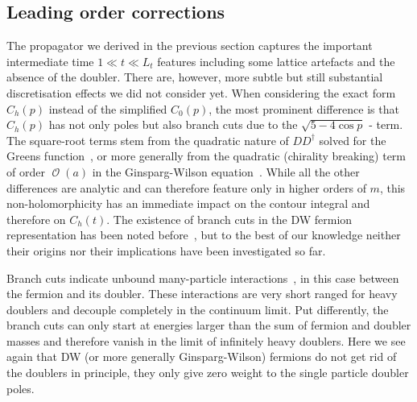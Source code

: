 \documentclass[a4paper]{article}
\DeclareMathOperator{\ord}{\mathcal{O}}
\newcommand{\ordnung}[1]{\ensuremath{\ord\left(#1\right)}}
\begin{document}
	\subsection{Leading order corrections}
	The propagator we derived in the previous section captures the important intermediate time $1\ll t \ll L_t$ features including some lattice artefacts and the absence of the doubler. There are, however, more subtle but still substantial discretisation effects we did not consider yet. When considering the exact form $C_h(p)$ instead of the simplified $C_0(p)$, the most prominent difference is that $C_h(p)$ has not only poles but also branch cuts due to the $\sqrt{5-4\cos p}$ - term. The square-root terms stem from the quadratic nature of $DD^\dagger$ solved for the Greens function~\cite{hands_thirring2016}, or more generally from the quadratic (chirality breaking) term of order $\ordnung{a}$ in the Ginsparg-Wilson equation~\cite{Ginsparg_Wilson}. While all the other differences are analytic and can therefore feature only in higher orders of $m$, this non-holomorphicity has an immediate impact on the contour integral and therefore on $C_h(t)$. The existence of branch cuts in the DW fermion representation has been noted before~\cite{Gavai_2009}, but to the best of our knowledge neither their origins nor their implications have been investigated so far.
	
	Branch cuts indicate unbound many-particle interactions~\cite{Peskin:1995ev}, in this case between the fermion and its doubler. These interactions are very short ranged for heavy doublers and decouple completely in the continuum limit. Put differently, the branch cuts can only start at energies larger than the sum of fermion and doubler masses and therefore vanish in the limit of infinitely heavy doublers. Here we see again that DW (or more generally Ginsparg-Wilson) fermions do not get rid of the doublers in principle, they only give zero weight to the single particle doubler poles.
	
\end{document}
